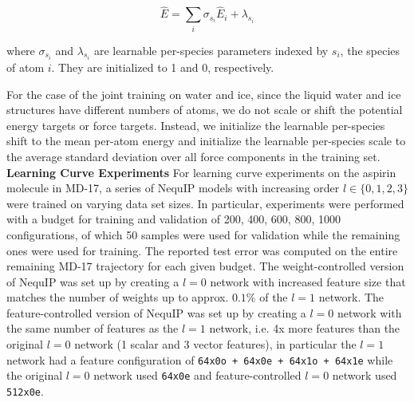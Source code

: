 \documentclass[11pt]{article}
\begin{document}
\begin{equation}
    \hat{E} = \sum_{i}{\sigma_{s_i}\hat{E}_{i} + \lambda_{s_i}}
\end{equation}

where $\sigma_{s_i}$ and $\lambda_{s_i}$ are learnable per-species parameters indexed by $s_i$, the species of atom $i$. They are initialized to 1 and 0, respectively. 

For the case of the joint training on water and ice, since the liquid water and ice structures have different numbers of atoms, we do not scale or shift the potential energy targets or force targets. Instead, we initialize the learnable per-species shift to the mean per-atom energy and initialize the learnable per-species scale to the average standard deviation over all force components in the training set.\\ 

\textbf{Learning Curve Experiments} For learning curve experiments on the aspirin molecule in MD-17, a series of NequIP models with increasing order $l \in \{0, 1, 2, 3\}$ were trained on varying data set sizes. In particular, experiments were performed with a budget for training and validation of 200, 400, 600, 800, 1000 configurations, of which 50 samples were used for validation while the remaining ones were used for training. The reported test error was computed on the entire remaining MD-17 trajectory for each given budget. The weight-controlled version of NequIP was set up by creating a $l=0$ network with increased feature size that matches the number of weights up to approx. $0.1\%$ of the $l=1$ network. The feature-controlled version of NequIP was set up by creating a $l=0$ network with the same number of features as the $l=1$ network, i.e. 4x more features than the original $l=0$ network (1 scalar and 3 vector features), in particular the $l=1$ network had a feature configuration of \texttt{64x0o + 64x0e + 64x1o + 64x1e} while the original $l=0$ network used \texttt{64x0e} and feature-controlled $l=0$ network used \texttt{512x0e}.\\
\end{document}
